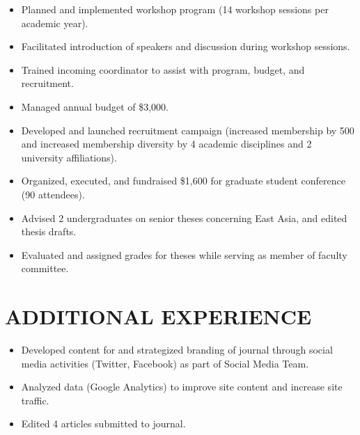 \documentclass[a4paper, 12pt]{classycv}
\begin{document}
\begin{resume}
    \begin{itemize}
        \item Planned and implemented workshop program (14 workshop sessions per academic year).
        \item Facilitated introduction of speakers and discussion during workshop sessions.
        \item Trained incoming coordinator to assist with program, budget, and recruitment.
        \item Managed annual budget of \$3,000.
        \item Developed and launched recruitment campaign (increased membership by 500 and increased membership diversity by 4 academic disciplines and 2 university affiliations).
        \item Organized, executed, and fundraised \$1,600 for graduate student conference (90 attendees).
    \end{itemize}


    \begin{itemize}
        \item Advised 2 undergraduates on senior theses concerning East Asia, and edited thesis drafts. 
        \item Evaluated and assigned grades for theses while serving as member of faculty committee.
    \end{itemize}

    \section{\MakeUppercase{Additional Experience}}

    
    \begin{itemize}
        \item Developed content for and strategized branding of journal through social media activities (Twitter, Facebook) as part of Social Media Team.
        \item Analyzed data (Google Analytics) to improve site content and increase site traffic.
        \item Edited 4 articles submitted to journal.
    \end{itemize}


\end{resume}
\end{document}
